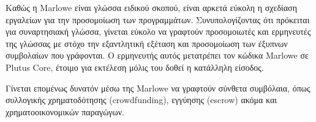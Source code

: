 Καθώς η Marlowe είναι γλώσσα ειδικού σκοπού, είναι αρκετά εύκολη η σχεδίαση εργαλείων για την 
προσομοίωση των προγραμμάτων. Συνυπολογίζοντας ότι πρόκειται για συναρτησιακή γλώσσα, γίνεται
εύκολο να γραφτούν προσομοιωτές και ερμηνευτές της γλώσσας με στόχο την εξαντλητική εξέταση και
προσομοίωση των έξυπνων συμβολαίων που γράφονται. Ο ερμηνευτής αυτός μετατρέπει τον κώδικα
Marlowe σε Plutus Core, έτοιμο για εκτέλεση μόλις του δοθεί η κατάλληλη είσοδος.

Γίνεται επομένως δυνατόν μέσω της Marlowe να γραφτούν σύνθετα συμβόλαια, όπως συλλογικής
χρηματοδότησης (crowdfunding), εγγύησης (escrow) ακόμα και χρηματοοικονομικών παραγώγων.                                                      
                              